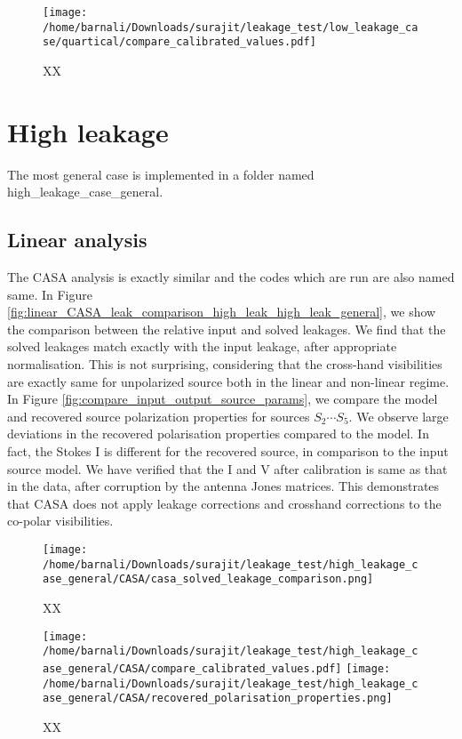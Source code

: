 \documentclass{article}
\begin{document}
\begin{figure}
\centering
\texttt{[image: /home/barnali/Downloads/surajit/leakage\_test/low\_leakage\_case/quartical/compare\_calibrated\_values.pdf]}
\caption{XX}
\label{fig:compare_input_output_source_params_nonlinear}
\end{figure}

\section{High leakage}

The most general case is implemented in a folder named high\_leakage\_case\_general. 

\subsection{Linear analysis}

The CASA analysis is exactly similar and the codes which are run are also named same. In Figure \ref{fig:linear_CASA_leak_comparison_high_leak_high_leak_general}, we show the comparison between the relative input and solved leakages. We find that the solved leakages match exactly with the input leakage, after appropriate normalisation. This is not surprising, considering that the cross-hand visibilities are exactly same for unpolarized source both in the linear and non-linear regime. In Figure \ref{fig:compare_input_output_source_params}, we compare the model and recovered source polarization properties for sources $S_2\cdots S_5$. We observe large deviations in the recovered polarisation properties compared to the model. In fact, the Stokes I is different for the recovered source, in comparison to the input source model. We have verified that the I and V after calibration is same as that in the data, after corruption by the antenna Jones matrices. This demonstrates that CASA does not apply leakage corrections and crosshand corrections to the co-polar visibilities.

\begin{figure}
\centering
\texttt{[image: /home/barnali/Downloads/surajit/leakage\_test/high\_leakage\_case\_general/CASA/casa\_solved\_leakage\_comparison.png]}
\caption{XX}
\label{fig:linear_CASA_leak_comparison_high_leak_general}
\end{figure} 

\begin{figure}
\centering
\texttt{[image: /home/barnali/Downloads/surajit/leakage\_test/high\_leakage\_case\_general/CASA/compare\_calibrated\_values.pdf]}
\texttt{[image: /home/barnali/Downloads/surajit/leakage\_test/high\_leakage\_case\_general/CASA/recovered\_polarisation\_properties.png]}
\caption{XX}
\label{fig:compare_input_output_source_params_high_leak_general}
\end{figure}
\end{document}
